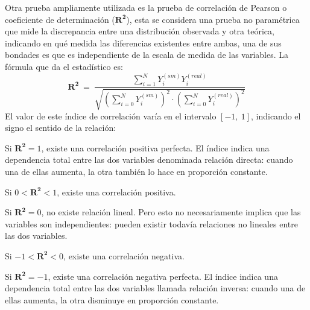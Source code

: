 Otra prueba ampliamente utilizada es la prueba de correlación de Pearson o coeficiente de determinación ($\mathbf{R^2}$), esta se considera una prueba no paramétrica que mide la discrepancia entre una distribución observada y otra teórica, indicando en qué medida las diferencias existentes entre ambas, una de sus bondades es que es independiente de la escala de medida de las variables. La fórmula que da el estadístico es:
\begin{equation}
\mathbf{R^2} ~ = ~ \dfrac{\sum_{i=1}^N Y_{i}^{(sm)} Y_{i}^{(real)}}{\sqrt{(\sum_{i=0}^N Y_{i}^{(sm)})^2\cdot (\sum_{i=0}^N Y_{i}^{(real)})^2}}
\end{equation}  
El valor de este índice de correlación varía en el intervalo $[-1,~1]$, indicando el signo el sentido de la relación:
\begin{itemize_f}
\item[-] Si $\mathbf{R^2} = 1$, existe una correlación positiva perfecta. El índice indica una dependencia total entre las dos variables denominada relación directa: cuando una de ellas aumenta, la otra también lo hace en proporción constante.
\item[-] Si $0 < \mathbf{R^2} < 1$, existe una correlación positiva.
\item[-] Si $\mathbf{R^2} = 0$, no existe relación lineal. Pero esto no necesariamente implica que las variables son independientes: pueden existir todavía relaciones no lineales entre las dos variables.
\item[-] Si $-1 < \mathbf{R^2} < 0$, existe una correlación negativa.
\item[-] Si $\mathbf{R^2} = -1$, existe una correlación negativa perfecta. El índice indica una dependencia total entre las dos variables llamada relación inversa: cuando una de ellas aumenta, la otra disminuye en proporción constante.
\end{itemize_f}











